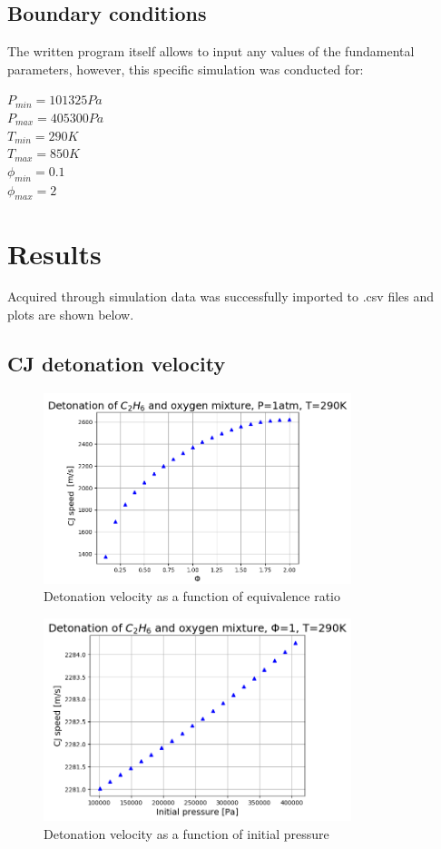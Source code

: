 \documentclass[a4paper]{article}
\begin{document}
\subsection{Boundary conditions}
The written program itself allows to input any values of the fundamental parameters, however, this specific simulation was conducted for: 
\begin{center}
    $P_{min} = 101325 Pa$\\
    \bigskip
    $P_{max} = 405300 Pa$\\
    \bigskip
    $T_{min} = 290 K$\\
    \bigskip
    $T_{max}= 850 K$\\
    \bigskip
    $\phi_{min} = 0.1$\\
    \bigskip
    $\phi_{max} = 2$\\
\end{center}
\newpage
\section{Results}
Acquired through simulation data was successfully imported to .csv files and plots are shown below.
\subsection{CJ detonation velocity}
\begin{figure}[H]
\centering
\includegraphics[width=0.8\textwidth]{CJspeed_Fi.png}
\caption{Detonation velocity as a function of equivalence ratio}
\end{figure}

\begin{figure}[H]
\centering
\includegraphics[width=0.8\textwidth]{CJspeed_Pi.png}
\caption{Detonation velocity as a function of initial pressure}
\end{figure}
\end{document}
